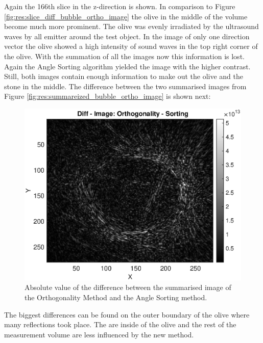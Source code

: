Again the 166th slice in the z-direction is shown. In comparison to Figure \ref{fig:res:slice_diff_bubble_ortho_image} the olive in the middle of the volume become much more prominent. The olive was evenly irradiated by the ultrasound waves by all emitter around the test object. In the image of only one direction vector the olive showed a high intensity of sound waves in the top right corner of the olive. With the summation of all the images now this information is lost. Again the Angle Sorting algorithm yielded the image with the higher contrast. Still, both images contain enough information to make out the olive and the stone in the middle. The difference between the two summarised images from Figure \ref{fig:res:summareized_bubble_ortho_image} is shown next:

\begin{figure}[H]
    \centering
    \includegraphics[width=0.82\linewidth]{Graphics/Results/Diff_angle_sort_orthogonality/diff_ortho_bubble_diffimage.eps}
    \caption{Absolute value of the difference between the summarised image of the Orthogonality Method and the Angle Sorting method. }
    \label{fig:diff_image}
\end{figure}

The biggest differences can be found on the outer boundary of the olive where many reflections took place. The are inside of the olive and the rest of the measurement volume are less influenced by the new method. 




